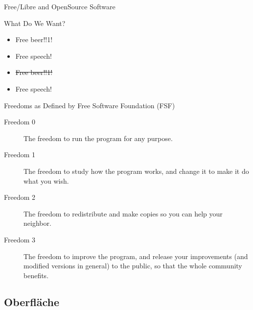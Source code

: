\documentclass{beamer}
\begin{document}
\begin{frame}{Free/Libre and OpenSource Software}
    \begin{block}{What Do We Want?}
        {
            \begin{itemize}
                \item Free beer!!1!
                \item<2-> Free speech!
            \end{itemize}
        }

        {
            \begin{itemize}
                \item \sout{Free beer!!1!}
                \item Free speech!
            \end{itemize}
        }
    \end{block}

    {
        \begin{block}{Freedoms as Defined by Free Software Foundation (FSF)}
            \begin{description}
                \item[Freedom 0] The freedom to run the program for any
                    purpose.
                \item[Freedom 1] The freedom to study how the program
                    works, and change it to make it do what you wish.
                \item[Freedom 2] The freedom to redistribute and make
                    copies so you can help your neighbor.
                \item[Freedom 3] The freedom to improve the program, and
                    release your improvements (and modified versions in
                    general) to the public, so that the whole community
                    benefits.
            \end{description}
        \end{block}
    }
\end{frame}

\subsection{Oberfläche}
\end{document}
